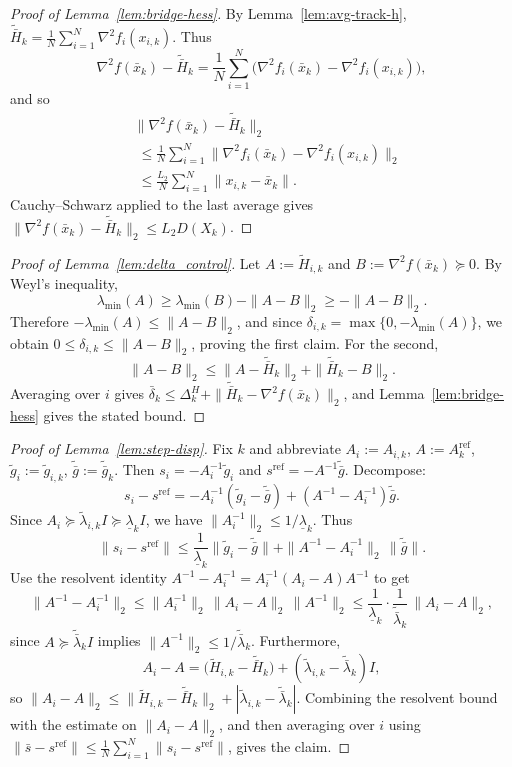 \documentclass[review,onefignum,onetabnum]{siamart171218}
\begin{document}
	\begin{proof}[Proof of Lemma~\ref{lem:bridge-hess}]
		By Lemma~\ref{lem:avg-track-h}, $\tilde{\bar H}_k=\frac1N\sum_{i=1}^N \nabla^2 f_i(x_{i,k})$.
		Thus
		\[
		\nabla^2 f(\bar x_k)-\tilde{\bar H}_k
		=\frac1N\sum_{i=1}^N\big(\nabla^2 f_i(\bar x_k)-\nabla^2 f_i(x_{i,k})\big),
		\]
		and so
		\begin{align*}
			&\|\nabla^2 f(\bar x_k)\!-\!\tilde{\bar H}_k\|_2\\
			&\;\le \tfrac1N\textstyle\sum_{i=1}^N\|\nabla^2 f_i(\bar x_k)\!-\!\nabla^2 f_i(x_{i,k})\|_2\\
			&\;\le \tfrac{L_2}{N}\textstyle\sum_{i=1}^N\|x_{i,k}\!-\!\bar x_k\|.
		\end{align*}
		Cauchy--Schwarz applied to the last average gives
		$\|\nabla^2 f(\bar x_k)-\tilde{\bar H}_k\|_2 \le L_2 D(X_k)$.
	\end{proof}
	
	\begin{proof}[Proof of Lemma~\ref{lem:delta_control}]
		Let $A:=\tilde H_{i,k}$ and $B:=\nabla^2 f(\bar x_k)\succeq0$.
		By Weyl's inequality,
		\[
		\lambda_{\min}(A)\ge \lambda_{\min}(B)-\|A-B\|_2\ge -\|A-B\|_2.
		\]
		Therefore $-\lambda_{\min}(A)\le \|A-B\|_2$, and since $\delta_{i,k}=\max\{0,-\lambda_{\min}(A)\}$,
		we obtain $0\le \delta_{i,k}\le \|A-B\|_2$, proving the first claim.
		For the second,
		\[
		\|A-B\|_2\le \|A-\tilde{\bar H}_k\|_2+\|\tilde{\bar H}_k-B\|_2.
		\]
		Averaging over $i$ gives
		$\bar\delta_k\le \Delta_k^H+\|\tilde{\bar H}_k-\nabla^2 f(\bar x_k)\|_2$,
		and Lemma~\ref{lem:bridge-hess} gives the stated bound.
	\end{proof}
	
	\begin{proof}[Proof of Lemma~\ref{lem:step-disp}]
		Fix $k$ and abbreviate $A_i:=A_{i,k}$, $A:=A_k^{\mathrm{ref}}$, $\tilde g_i:=\tilde g_{i,k}$, $\tilde{\bar g}:=\tilde{\bar g}_k$.
		Then $s_i=-A_i^{-1}\tilde g_i$ and $s^{\mathrm{ref}}=-A^{-1}\tilde{\bar g}$.
		Decompose:
		\[
		s_i-s^{\mathrm{ref}}
		=-A_i^{-1}(\tilde g_i-\tilde{\bar g}) + (A^{-1}-A_i^{-1})\tilde{\bar g}.
		\]
		Since $A_i\succeq \tilde\lambda_{i,k}I\succeq \underline\lambda_k I$, we have $\|A_i^{-1}\|_2\le 1/\underline\lambda_k$.
		Thus
		\[
		\|s_i-s^{\mathrm{ref}}\|
		\le \frac1{\underline\lambda_k}\|\tilde g_i-\tilde{\bar g}\|+\|A^{-1}-A_i^{-1}\|_2\,\|\tilde{\bar g}\|.
		\]
		Use the resolvent identity $A^{-1}-A_i^{-1}=A_i^{-1}(A_i-A)A^{-1}$ to get
		\[
		\|A^{-1}-A_i^{-1}\|_2\le \|A_i^{-1}\|_2\,\|A_i-A\|_2\,\|A^{-1}\|_2
		\le \frac1{\underline\lambda_k}\cdot \frac1{\tilde{\bar\lambda}_k}\,\|A_i-A\|_2,
		\]
		since $A\succeq \tilde{\bar\lambda}_k I$ implies $\|A^{-1}\|_2\le 1/\tilde{\bar\lambda}_k$.
		Furthermore,
		\[
		A_i-A=\big(\tilde H_{i,k}-\tilde{\bar H}_k\big)+(\tilde\lambda_{i,k}-\tilde{\bar\lambda}_k)I,
		\]
		so $\|A_i-A\|_2\le \|\tilde H_{i,k}-\tilde{\bar H}_k\|_2+|\tilde\lambda_{i,k}-\tilde{\bar\lambda}_k|$.
		Combining the resolvent bound with the estimate on $\|A_i-A\|_2$,
		and then averaging over $i$ using
		$\|\bar s-s^{\mathrm{ref}}\|\le \frac1N\sum_{i=1}^N\|s_i-s^{\mathrm{ref}}\|$,
		gives the claim.
	\end{proof}
	
\end{document}
